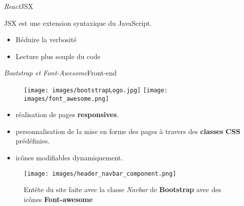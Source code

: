 \documentclass[usenames,dvipsnames]{beamer}
\begin{document}
\begin{frame}{\textit{React}}{JSX}
  \begin{block}{}
  JSX est une extension syntaxique du JavaScript.
  \end{block}

  \begin{itemize}
    \item Réduire la verbosité
    \item Lecture plus souple du code
  \end{itemize}
\end{frame}
\begin{frame}{\textit{Bootstrap et Font-Awesome}}{Front-end}
  \begin{figure}[!ht]
    \texttt{[image: images/bootstrapLogo.jpg]}
    \hfill
    \texttt{[image: images/font\_awesome.png]}
  \end{figure}

  \begin{itemize}
    \item réalisation de pages \textbf{responsives}.
    \item personnalisation de la mise en forme des pages à travers des \textbf{classes CSS} prédéfinies.
    \item icônes modifiables dynamiquement.
  \end{itemize}

  \begin{figure}[!ht]
    \texttt{[image: images/header\_navbar\_component.png]}
    \caption{Entête du site faite avec la classe \textit{Navbar} de \textbf{Bootstrap} avec des icônes \textbf{Font-awesome}}
  \end{figure}
\end{frame}
\end{document}
